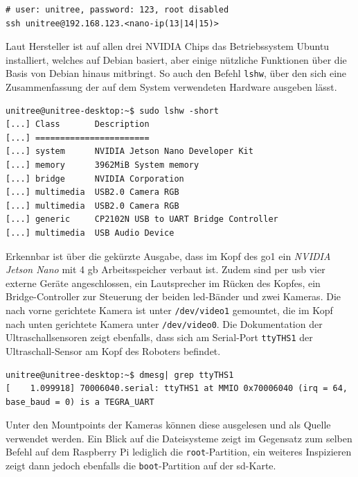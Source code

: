 \begin{lstlisting}[label=lst:nanos-ssh]
# user: unitree, password: 123, root disabled
ssh unitree@192.168.123.<nano-ip(13|14|15)>
\end{lstlisting}

Laut Hersteller ist auf allen drei NVIDIA Chips das Betriebssystem Ubuntu installiert, welches auf Debian basiert, aber einige nützliche
Funktionen über die Basis von Debian hinaus mitbringt.
So auch den Befehl \texttt{lshw}, über den sich eine Zusammenfassung der auf dem System verwendeten Hardware ausgeben lässt.

\begin{lstlisting}[label=lst:nanos-hardware-kopf, columns=fixed]
unitree@unitree-desktop:~$ sudo lshw -short
[...] Class       Description
[...] =======================
[...] system      NVIDIA Jetson Nano Developer Kit
[...] memory      3962MiB System memory
[...] bridge      NVIDIA Corporation
[...] multimedia  USB2.0 Camera RGB
[...] multimedia  USB2.0 Camera RGB
[...] generic     CP2102N USB to UART Bridge Controller
[...] multimedia  USB Audio Device
\end{lstlisting}

\noindent Erkennbar ist über die gekürzte Ausgabe, dass im Kopf des \gls{go1} ein \emph{NVIDIA Jetson Nano} mit \num{4} \gls{gb}
Arbeitsspeicher verbaut ist.
Zudem sind per \gls{usb} vier externe Geräte angeschlossen, ein Lautsprecher im Rücken des Kopfes, ein Bridge-Controller
zur Steuerung der beiden \gls{led}-Bänder und zwei Kameras.
Die nach vorne gerichtete Kamera ist unter \texttt{/dev/video1} gemountet, die im Kopf nach unten gerichtete Kamera unter
\texttt{/dev/video0}.
Die Dokumentation der Ultraschallsensoren zeigt ebenfalls, dass sich am Serial-Port \texttt{ttyTHS1} der Ultraschall-Sensor
am Kopf des Roboters befindet.

\begin{lstlisting}[label=lst:nano-head-ulrtassonic]
unitree@unitree-desktop:~$ dmesg| grep ttyTHS1
[    1.099918] 70006040.serial: ttyTHS1 at MMIO 0x70006040 (irq = 64, base_baud = 0) is a TEGRA_UART
\end{lstlisting}

\noindent Unter den Mountpoints der Kameras können diese ausgelesen und als Quelle verwendet werden.
Ein Blick auf die Dateisysteme zeigt im Gegensatz zum selben Befehl auf dem Raspberry Pi lediglich die \texttt{root}-Partition,
ein weiteres Inspizieren zeigt dann jedoch ebenfalls die \texttt{boot}-Partition auf der \gls{sd}-Karte.


